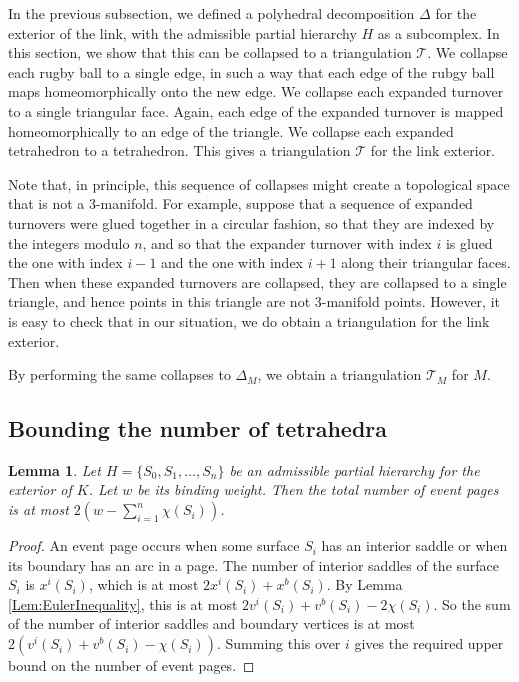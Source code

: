\documentclass[oneside]{amsart}
\numberwithin{equation}{section}
\theoremstyle{plain}
\newtheorem{lemma}[equation]{Lemma}
\theoremstyle{definition}
\newcommand{\calT}{{\mathcal{T}}}
\begin{document}
In the previous subsection, we defined a polyhedral decomposition $\Delta$ for the exterior of
the link, with the admissible partial hierarchy $H$ as a subcomplex. In this section, we show that this can be collapsed to
a triangulation $\mathcal{T}$. We collapse each rugby ball to a single edge, in such a way that
each edge of the rubgy ball maps homeomorphically onto the new edge. We collapse each
expanded turnover to a single triangular face. Again, each edge of the expanded turnover is mapped
homeomorphically to an edge of the triangle. We collapse each expanded tetrahedron
to a tetrahedron. This gives a triangulation $\mathcal{T}$ for the link exterior.

Note that, in principle, this sequence of collapses might create a topological space that is not a 3-manifold.
For example, suppose that a sequence of expanded turnovers were glued together in a circular fashion,
so that they are indexed by the integers modulo $n$, and so that the expander turnover with index $i$
is glued the one with index $i-1$ and the one with index $i+1$ along their triangular faces. Then
when these expanded turnovers are collapsed, they are collapsed to a single triangle, and hence points
in this triangle are not 3-manifold points. However, it is easy to check that in our situation,
we do obtain a triangulation for the link exterior.

By performing the same collapses to $\Delta_M$, we obtain a triangulation $\calT_M$ for $M$.

\subsection{Bounding the number of tetrahedra}

\begin{lemma}
\label{Lem:NumberEventLevels}
Let $H = \{ S_0, S_1, \dots, S_n \}$ be an admissible partial hierarchy for the exterior of $K$.
Let $w$ be its binding weight. Then the total number of event pages is at most
$2 ( w -  \sum_{i=1}^n \chi(S_i))$. 
\end{lemma}

\begin{proof}
An event page occurs when some surface $S_i$ has an interior saddle or when its
boundary has an arc in a page. The number of interior saddles of the surface $S_i$ is $x^i(S_i)$,
which is at most $2x^i(S_i) + x^b(S_i)$. By Lemma \ref{Lem:EulerInequality}, this is at most
$2v^i(S_i) + v^b(S_i) - 2 \chi(S_i)$. So the sum of the number of interior saddles
and boundary vertices is at most $2 (v^i(S_i) + v^b(S_i) - \chi(S_i))$. Summing this
over $i$ gives the required upper bound on the number of event pages.
\end{proof}
\end{document}
